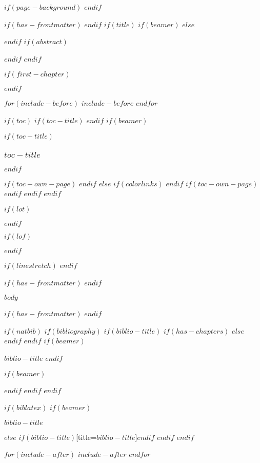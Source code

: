 \documentclass[
$if(fontsize)$
  $fontsize$,
$endif$
$if(lang)$
  $babel-lang$,
$endif$
$if(papersize)$
  $papersize$paper,
$else$
  a4paper,
$endif$
$if(beamer)$
  ignorenonframetext,
  $if(handout)$
    handout,
  $endif$
  $if(aspectratio)$
    aspectratio=$aspectratio$,
  $endif$
$endif$
$for(classoption)$
  $classoption$$sep$,
$endfor$
captions=tableheading,
twoside
]{$if(beamer)$$documentclass$$else$$if(book)$scrbook$else$scrartcl$endif$$endif$}
\newif\ifbibliography
\begin{document}
$if(page-background)$
$endif$

$if(has-frontmatter)$
  \frontmatter
$endif$
$if(title)$
  $if(beamer)$
  \frame{\titlepage}  
  $else$
  \maketitle
  $endif$
  $if(abstract)$
  \begin{abstract}
    $abstract$
  \end{abstract}
  $endif$
$endif$

$if(first-chapter)$
  \setcounter{chapter}{$first-chapter$}
  \addtocounter{chapter}{-1}
$endif$

$for(include-before)$
  $include-before$
$endfor$

$if(toc)$
  $if(toc-title)$
  \renewcommand*\contentsname{$toc-title$}
  $endif$
  $if(beamer)$
  \begin{frame}[allowframebreaks]
      $if(toc-title)$
    \frametitle{$toc-title$}
      $endif$
    \tableofcontents[hideallsubsections]
    \clearpage %
  \end{frame}
    $if(toc-own-page)$
  \newpage %
    $endif$
  $else$
  {
  $if(colorlinks)$
    \hypersetup{linkcolor=$if(toccolor)$$toccolor$$else$$endif$}
      $endif$
    \setcounter{tocdepth}{$if(toc-depth)$$toc-depth$$else$5$endif$}
    \tableofcontents
    \clearpage %
      $if(toc-own-page)$
    \newpage
      $endif$
  }
  $endif$
$endif$

$if(lot)$
  \listoftables
$endif$

$if(lof)$
  \listoffigures
$endif$

$if(linestretch)$
$endif$

$if(has-frontmatter)$
  \mainmatter
$endif$

$body$

$if(has-frontmatter)$
  \backmatter
$endif$

$if(natbib)$
  $if(bibliography)$
    $if(biblio-title)$
      $if(has-chapters)$
  \renewcommand\bibname{$biblio-title$}
      $else$
  \renewcommand\refname{$biblio-title$}
      $endif$
    $endif$
    $if(beamer)$
  \begin{frame}[allowframebreaks]{$biblio-title$}
    \bibliographytrue
    $endif$
    
    $if(beamer)$
  \end{frame}
    $endif$
  $endif$
$endif$

$if(biblatex)$
  $if(beamer)$
  \begin{frame}[allowframebreaks]{$biblio-title$}
    \bibliographytrue
    \printbibliography[heading=none]
  \end{frame}
  $else$
  \printbibliography$if(biblio-title)$[title=$biblio-title$]$endif$
  $endif$
$endif$

$for(include-after)$
  $include-after$
$endfor$
\end{document}
